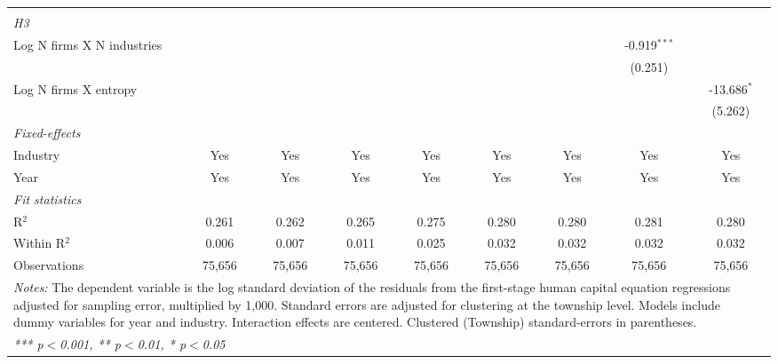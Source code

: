 \begin{tabular}{lcccccccc}
\hdashline %
\\[0.1ex] %
\emph{H3} \\ 
   Log N firms X N industries                            &                  &                 &                  &                  &                  &                  & -0.919$^{***}$   &   \\   
                                                         &                  &                 &                  &                  &                  &                  & (0.251)          &   \\   
   Log N firms X entropy                                 &                  &                 &                  &                  &                  &                  &                  & -13.686$^{*}$\\   
                                                         &                  &                 &                  &                  &                  &                  &                  & (5.262)\\   
   \midrule
   \emph{Fixed-effects}\\
   Industry                                              & Yes              & Yes             & Yes              & Yes              & Yes              & Yes              & Yes              & Yes\\  
   Year                                                  & Yes              & Yes             & Yes              & Yes              & Yes              & Yes              & Yes              & Yes\\  
   \midrule
   \emph{Fit statistics}\\
   R$^2$                                                 & 0.261            & 0.262           & 0.265            & 0.275            & 0.280            & 0.280            & 0.281            & 0.280\\  
   Within R$^2$                                          & 0.006            & 0.007           & 0.011            & 0.025            & 0.032            & 0.032            & 0.032            & 0.032\\  
   Observations                                          & 75,656           & 75,656          & 75,656           & 75,656           & 75,656           & 75,656           & 75,656           & 75,656\\  
   \midrule \midrule
\multicolumn{9}{p{24cm}}{\emph{Notes:} The dependent variable is the log 
    standard deviation of the residuals from the first-stage human capital equation 
    regressions adjusted for sampling error, multiplied by 1,000. Standard errors 
    are adjusted for clustering at the township level. Models include dummy variables 
    for year and industry. Interaction effects are centered. Clustered (Township) 
    standard-errors in parentheses.}\\
\multicolumn{9}{l}{\emph{*** p$<$0.001, ** p$<$0.01, * p$<$0.05}} \\ 
\end{tabular}
\par\endgroup
